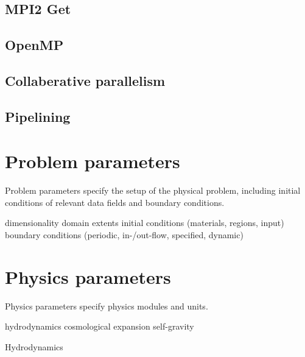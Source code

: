 \documentclass{book}
\begin{document}
\subsection{MPI2 Get}

\subsection{OpenMP}

\subsection{Collaberative parallelism}

\subsection{Pipelining}




\section{Problem parameters}

Problem parameters specify the setup of the physical problem,
including initial conditions of relevant data fields and boundary
conditions.

  dimensionality
  domain extents
  initial conditions (materials, regions, input)
 boundary conditions (periodic, in-/out-flow, specified, dynamic)

\section{Physics parameters}

Physics parameters specify physics modules and units.

 hydrodynamics
  cosmological expansion
 self-gravity

Hydrodynamics


\end{document}
